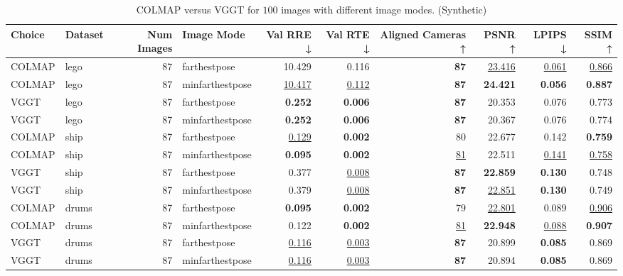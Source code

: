 \begin{table}[H]
\caption{\ifdefined\customcaption \customcaption \else COLMAP versus VGGT for $100$ images with different image modes. (Synthetic) \fi}
\label{tab:01_image_mode_dense_synthetic}
\centering
\scriptsize
\begin{tabular}{llrlrrrrrr}
\toprule
Choice & Dataset & Num Images & Image Mode & Val RRE ↓ & Val RTE ↓ & Aligned Cameras ↑ & PSNR ↑ & LPIPS ↓ & SSIM ↑ \\
\midrule
COLMAP & lego & 87 & farthestpose & 10.429 & 0.116 & \textbf{87} & \underline{23.416} & \underline{0.061} & \underline{0.866} \\
COLMAP & lego & 87 & minfarthestpose & \underline{10.417} & \underline{0.112} & \textbf{87} & \textbf{24.421} & \textbf{0.056} & \textbf{0.887} \\
VGGT & lego & 87 & farthestpose & \textbf{0.252} & \textbf{0.006} & \textbf{87} & 20.353 & 0.076 & 0.773 \\
VGGT & lego & 87 & minfarthestpose & \textbf{0.252} & \textbf{0.006} & \textbf{87} & 20.367 & 0.076 & 0.774 \\
\midrule
COLMAP & ship & 87 & farthestpose & \underline{0.129} & \textbf{0.002} & 80 & 22.677 & 0.142 & \textbf{0.759} \\
COLMAP & ship & 87 & minfarthestpose & \textbf{0.095} & \textbf{0.002} & \underline{81} & 22.511 & \underline{0.141} & \underline{0.758} \\
VGGT & ship & 87 & farthestpose & 0.377 & \underline{0.008} & \textbf{87} & \textbf{22.859} & \textbf{0.130} & 0.748 \\
VGGT & ship & 87 & minfarthestpose & 0.379 & \underline{0.008} & \textbf{87} & \underline{22.851} & \textbf{0.130} & 0.749 \\
\midrule
COLMAP & drums & 87 & farthestpose & \textbf{0.095} & \textbf{0.002} & 79 & \underline{22.801} & 0.089 & \underline{0.906} \\
COLMAP & drums & 87 & minfarthestpose & 0.122 & \textbf{0.002} & \underline{81} & \textbf{22.948} & \underline{0.088} & \textbf{0.907} \\
VGGT & drums & 87 & farthestpose & \underline{0.116} & \underline{0.003} & \textbf{87} & 20.899 & \textbf{0.085} & 0.869 \\
VGGT & drums & 87 & minfarthestpose & \underline{0.116} & \underline{0.003} & \textbf{87} & 20.894 & \textbf{0.085} & 0.869 \\
\bottomrule
\end{tabular}
\end{table}